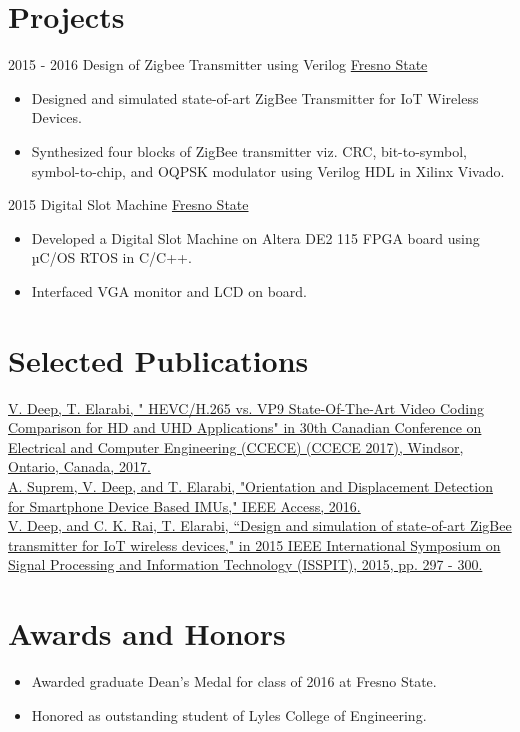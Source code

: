 \documentclass[letterpaper]{twentysecondcv} %
\begin{document}
\section{Projects}
\begin{twenty}
	\twentyitem
    	{2015 - 2016}
		{}
        {Design of Zigbee Transmitter using Verilog}
        {\href{https://www.fresnostate.edu/engineering/elec-computer/}{Fresno State}}
        {}
        {
        {\begin{itemize}
        \item Designed and simulated state-of-art ZigBee Transmitter for IoT Wireless Devices.
        \item Synthesized four blocks of ZigBee transmitter viz. CRC, bit-to-symbol, symbol-to-chip, and OQPSK modulator using Verilog HDL in Xilinx Vivado.
		\end{itemize}} \vspace{2mm}
        }
        
    \twentyitem
    	{2015 }
		{}
        {Digital Slot Machine}
        {\href{https://www.fresnostate.edu/engineering/elec-computer/}{Fresno State}}
        {}
        {
        {\begin{itemize}
\item Developed a Digital Slot Machine on Altera DE2 115 FPGA board using µC/OS RTOS in C/C++. 
        \item Interfaced VGA monitor and LCD on board. \vspace{2mm}
		\end{itemize}}
        }
\end{twenty}

\section{Selected Publications}
\href{https://ieeexplore.ieee.org/document/7946796/}{V. Deep, T. Elarabi, " HEVC/H.265 vs. VP9 State-Of-The-Art Video Coding Comparison for HD and UHD Applications" in  30th Canadian Conference on Electrical and Computer Engineering (CCECE) (CCECE 2017), Windsor, Ontario, Canada, 2017. }
\vspace{2mm} \\
\href{https://ieeexplore.ieee.org/document/7748482/}{A. Suprem, V. Deep, and T. Elarabi, "Orientation and Displacement Detection for Smartphone Device Based IMUs," IEEE Access, 2016.}
\vspace{2mm} \\
\href{https://ieeexplore.ieee.org/document/7394347/}{V. Deep, and C. K. Rai, T. Elarabi, “Design and simulation of state-of-art ZigBee transmitter for IoT wireless devices," in 2015 IEEE International Symposium on Signal Processing and Information Technology (ISSPIT), 2015, pp. 297 - 300. }

\section{Awards and Honors}
\begin{itemize}
\item Awarded graduate Dean’s Medal for class of 2016 at Fresno State.
\item Honored as outstanding student of Lyles College of Engineering.
\end{itemize}
\end{document}
